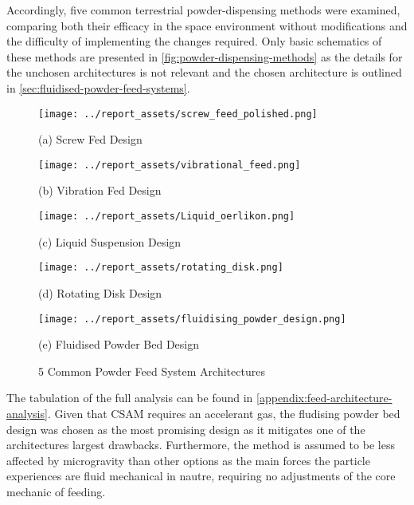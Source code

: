 Accordingly, five common terrestrial powder-dispensing methods were examined, comparing both their efficacy in the space environment without modifications and the difficulty of implementing the changes required. Only basic schematics of these methods are presented in \autoref{fig:powder-dispensing-methods} as the details for the unchosen architectures is not relevant and the chosen architecture is outlined in \autoref{sec:fluidised-powder-feed-systems}. 
\begin{figure}[htbp]
    \centering

    \begin{minipage}{0.3\textwidth}
        \centering
        \texttt{[image: ../report\_assets/screw\_feed\_polished.png]}
        \caption*{(a) Screw Fed Design~\cite{Bitragunta2015}}
    \end{minipage}
    \hfill
    \begin{minipage}{0.3\textwidth}
        \centering
        \texttt{[image: ../report\_assets/vibrational\_feed.png]}
        \caption*{(b) Vibration Fed Design~\cite{Sinclair2021}}
    \end{minipage}
    \hfill
    \begin{minipage}{0.3\textwidth}
        \centering
        \texttt{[image: ../report\_assets/Liquid\_oerlikon.png]}
        \caption*{(c) Liquid Suspension Design~\cite{OerlikonMetcoFeeders2023}}
    \end{minipage}

    \vspace{0.5cm} %
    
    \begin{minipage}{0.35\textwidth}
        \centering
        \texttt{[image: ../report\_assets/rotating\_disk.png]}
        \caption*{(d) Rotating Disk Design~\cite{Crawmer2013}}
    \end{minipage}
    \hspace{0.1\textwidth}
    \begin{minipage}{0.35\textwidth}
        \centering
        \texttt{[image: ../report\_assets/fluidising\_powder\_design.png]}
        \caption*{(e) Fluidised Powder Bed Design~\cite{Li2016}}
    \end{minipage}
    
    \caption{5 Common Powder Feed System Architectures}\label{fig:powder-dispensing-methods}
\end{figure}
The tabulation of the full analysis can be found in \autoref{appendix:feed-architecture-analysis}. Given that CSAM requires an accelerant gas, the fludising powder bed design was chosen as the most promising design as it mitigates one of the architectures largest drawbacks. Furthermore, the method is assumed to be less affected by microgravity than other options as the main forces the particle experiences are fluid mechanical in nautre, requiring no adjustments of the core mechanic of feeding. 

